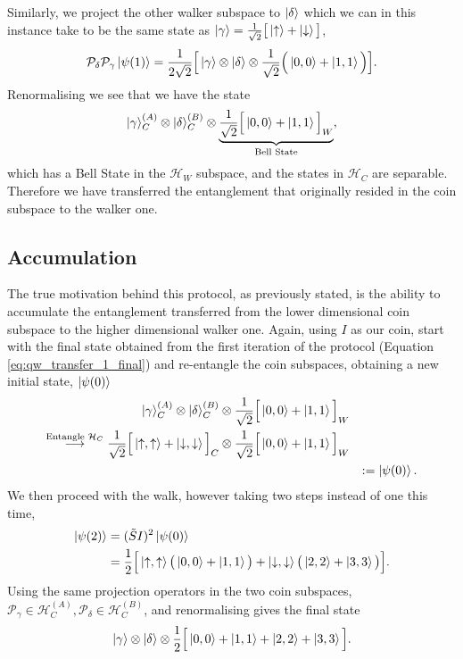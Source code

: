 Similarly, we project the other walker subspace to $\ket{\delta}$ which we can in this instance take to be the same state as $\ket{\gamma} = \frac{1}{\sqrt{2}} \big [\ket{\uparrow} + \ket{\downarrow} \big]$,
\begin{equation}
    \mathcal{P}_\delta \mathcal{P}_\gamma \ket{\psi(1)} = \frac{1}{2\sqrt{2}}\Big [\ket{\gamma}\otimes \ket{\delta} \otimes \frac{1}{\sqrt{2}}\Big (\ket{0, 0} + \ket{1, 1}\Big )\Big ].
\end{equation}
Renormalising we see that we have the state
\begin{equation}
    \label{eq:qw_transfer_1_final}
    \ket{\gamma}^{(A)}_C \otimes \ket{\delta}^{(B)}_C \otimes \underbrace{\frac{1}{\sqrt{2}}\Big [\ket{0, 0} + \ket{1, 1}\Big ]_W}_{\text{Bell State}},
\end{equation}
which has a Bell State in the $\mathcal{H}_W$ subspace, and the states in $\mathcal{H}_C$ are separable. Therefore we have transferred the entanglement that originally resided in the coin subspace to the walker one.

\subsection{Accumulation}
\label{subsection:qw_accumulation}
The true motivation behind this protocol, as previously stated, is the ability to accumulate the entanglement transferred from the lower dimensional coin subspace to the higher dimensional walker one. Again, using $I$ as our coin, start with the final state obtained from the first iteration of the protocol (Equation \ref{eq:qw_transfer_1_final}) and re-entangle the coin subspaces, obtaining a new initial state, $\ket{\psi(0)}$
\begin{alignat}{3}
    \ket{\gamma}^{(A)}_C \otimes \ket{\delta}^{(B)}_C&\otimes \frac{1}{\sqrt{2}}\Big [\ket{0, 0} + \ket{1, 1}\Big ]_W\\
    \overset{\text{Entangle }\mathcal{H}_C}{\longrightarrow} \frac{1}{\sqrt{2}} \Big [\ket{\uparrow, \uparrow} + \ket{\downarrow, \downarrow}\Big ]_C&\otimes \frac{1}{\sqrt{2}}\Big [\ket{0, 0} + \ket{1, 1}\Big ]_W\\
    & &:=\ket{\psi(0)}.
\end{alignat}
We then proceed with the walk, however taking two steps instead of one this time,
\begin{align}
    \ket{\psi(2)} &= (\tilde{S}I)^2\ket{\psi(0)}\\
    &= \frac{1}{2}\Big[\ket{\uparrow,\uparrow}\big (\ket{0,0}+\ket{1,1}\big ) + \ket{\downarrow,\downarrow}\big (\ket{2,2} + \ket{3,3}\big )\Big ].
\end{align}
Using the same projection operators in the two coin subspaces, $\mathcal{P}_\gamma \in \mathcal{H}^{(A)}_C,  \mathcal{P}_\delta \in \mathcal{H}^{(B)}_C$, and renormalising gives the final state
\begin{equation}
    \ket{\gamma}\otimes\ket{\delta}\otimes\frac{1}{2}\Big[\ket{0,0} + \ket{1,1} + \ket{2,2} + \ket{3,3}\Big ].
\end{equation}

